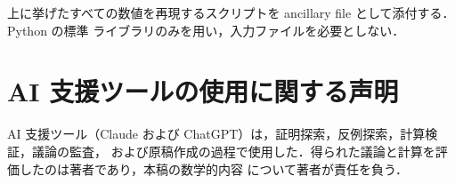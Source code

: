 \documentclass[11pt]{article}
\theoremstyle{plain}
\theoremstyle{definition}
\theoremstyle{remark}
\begin{document}
上に挙げたすべての数値を再現するスクリプトを ancillary file として添付する．Python の標準
ライブラリのみを用い，入力ファイルを必要としない．

\section*{AI 支援ツールの使用に関する声明}

AI 支援ツール（Claude および ChatGPT）は，証明探索，反例探索，計算検証，議論の監査，
および原稿作成の過程で使用した．得られた議論と計算を評価したのは著者であり，本稿の数学的内容
について著者が責任を負う．



\end{document}
